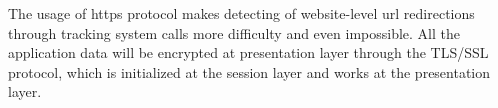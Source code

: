 The usage of https protocol makes detecting of website-level url redirections through tracking system calls more difficulty and even impossible. All the application data will be encrypted at presentation layer through the TLS/SSL protocol, which is initialized at the session layer and works at the presentation layer.

